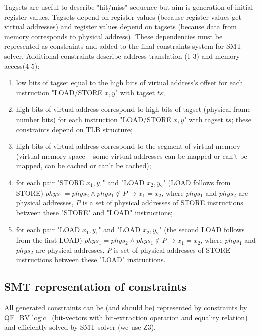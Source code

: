 \documentclass[times, 10pt,twocolumn]{article}
\begin{document}
Tagsets are useful to describe "hit/miss" sequence but aim is
generation of initial register values. Tagsets depend on register
values (because register values get virtual addresses) and register
values depend on tagsets (because data from memory corresponds to
physical address). These dependencies must be represented as
constraints and added to the final constraints system for
SMT-solver. Additional constraints describe address translation
(1-3) and memory access(4-5):
\begin{enumerate}

\item low bits of tagset equal to the high bits of virtual address's offset for each
instruction "LOAD/STORE $x, y$" with tagset $ts$;

\item high bits of virtual address correspond to high bits of tagset
(physical frame number bits) for each instruction "LOAD/STORE $x,
y$" with tagset $ts$; these constraints depend on TLB structure;

\item high bits of virtual address correspond to the segment of
virtual memory (virtual memory space -- some virtual addresses can
be mapped or can't be mapped, can be cached or can't be cached);

\item for each pair "STORE $x_1, y_1$"
and "LOAD $x_2, y_2$" (LOAD follows from STORE) $phys_1 = phys_2
\wedge phys_1 \notin P \rightarrow x_1 = x_2$, where $phys_1$ and
$phys_2$ are physical addresses, $P$ is a set of physical addresses
of STORE instructions between these "STORE" and "LOAD" instructions;

\item for each pair "LOAD
$x_1, y_1$" and "LOAD $x_2, y_2$" (the second LOAD follows from the
first LOAD) $phys_1 = phys_2 \wedge phys_1 \notin P \rightarrow x_1
= x_2$, where $phys_1$ and $phys_2$ are physical addresses, $P$ is
set of physical addresses of STORE instructions between these "LOAD"
instructions.
\end{enumerate}

\subsection{SMT representation of constraints}
All generated constraints can be (and should be) represented by
constraints by QF\_BV logic~\cite{smt-lib} (bit-vectors with
bit-extraction operation and equality relation) and efficiently
solved by SMT-solver (we use Z3).
\end{document}
